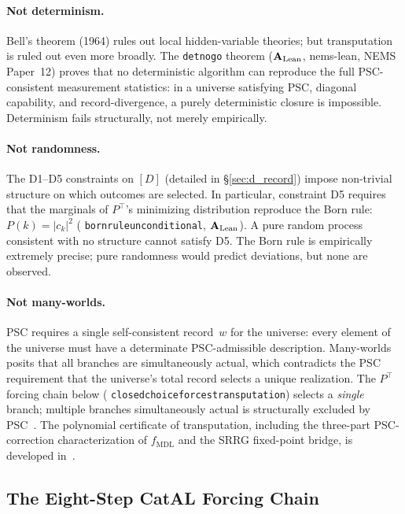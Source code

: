 \documentclass[11pt,openany]{book}
\theoremstyle{remark}
\newcommand{\lean}[1]{%
  \penalty-100
  \begingroup\def\_{\textunderscore\allowbreak}\texttt{#1}\endgroup}
\newcommand{\CatAL}{\ensuremath{\textbf{A}_{\rm Lean}}}
\begin{document}
\paragraph{Not determinism.}
Bell's theorem (1964) rules out local hidden-variable theories; but transputation is
ruled out even more broadly.  The \lean{det\_no\_go} theorem (\CatAL, nems-lean, NEMS
Paper~12) proves that no deterministic algorithm can reproduce the full PSC-consistent
measurement statistics: in a universe satisfying PSC, diagonal capability, and
record-divergence, a purely deterministic closure is impossible.  Determinism fails
structurally, not merely empirically.

\paragraph{Not randomness.}
The D1--D5 constraints on $[D]$ (detailed in §\ref{sec:d_record}) impose non-trivial
structure on which outcomes are selected.  In particular, constraint D5 requires that
the marginals of $P^\top$'s minimizing distribution reproduce the Born rule: $P(k) =
|c_k|^2$ (\lean{born\_rule\_unconditional}, \CatAL).  A pure random process consistent
with no structure cannot satisfy D5.  The Born rule is empirically extremely precise;
pure randomness would predict deviations, but none are observed.

\paragraph{Not many-worlds.}
PSC requires a single self-consistent record~$w$ for the universe: every element of the
universe must have a determinate PSC-admissible description.  Many-worlds posits that all
branches are simultaneously actual, which contradicts the PSC requirement that the
universe's total record selects a unique realization.  The $P^\top$ forcing chain
below (\lean{closed\_choice\_forces\_transputation}) selects a \emph{single} branch;
multiple branches simultaneously actual is structurally excluded by PSC~\cite{SpivackGTEMobius}.
The polynomial certificate of transputation, including the three-part
PSC-correction characterization of $f_{\mathrm{MDL}}$ and the SRRG
fixed-point bridge, is developed in~\cite{SpivackPolynomialTransputation}.

\subsection*{The Eight-Step CatAL Forcing Chain}
\end{document}
